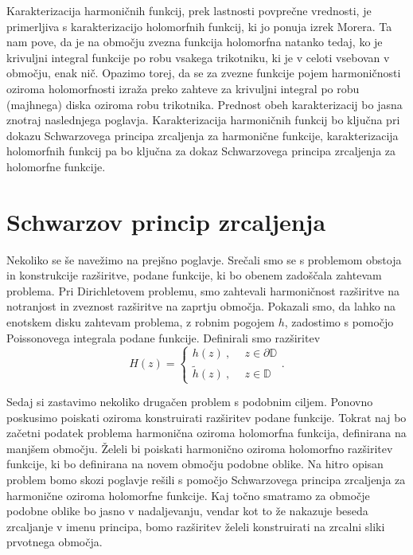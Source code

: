 \documentclass[mat1, tisk]{fmfdelo}
\begin{document}
    Karakterizacija harmoničnih funkcij, prek lastnosti povprečne vrednosti, je primerljiva s karakterizacijo holomorfnih funkcij, ki jo ponuja izrek Morera. 
    Ta nam pove, da je na območju zvezna funkcija holomorfna natanko tedaj, ko je krivuljni integral funkcije po robu vsakega trikotniku, ki je v celoti vsebovan v območju, enak nič.
    Opazimo torej, da se za zvezne funkcije pojem harmoničnosti oziroma holomorfnosti izraža preko zahteve za krivuljni integral po robu (majhnega) diska oziroma robu trikotnika.
    Prednost obeh karakterizacij bo jasna znotraj naslednjega poglavja. Karakterizacija harmoničnih funkcij bo ključna pri dokazu Schwarzovega principa zrcaljenja za harmonične funkcije, 
    karakterizacija holomorfnih funkcij pa bo ključna za dokaz Schwarzovega principa zrcaljenja za holomorfne funkcije. 


\section{Schwarzov princip zrcaljenja}

Nekoliko se še navežimo na prejšno poglavje. 
Srečali smo se s problemom obstoja in konstrukcije razširitve, podane funkcije, ki bo obenem zadoščala zahtevam problema.  
Pri Dirichletovem problemu, smo zahtevali harmoničnost razširitve na notranjost in zveznost razširitve na zaprtju območja. 
Pokazali smo, da lahko na enotskem disku zahtevam problema, z robnim pogojem $h$, zadostimo s pomočjo Poissonovega integrala podane funkcije. Definirali smo razširitev
$$
    H(z) = 
    \begin{cases}
        h(z)~,~~&z \in \partial \mathbb{D} \\
        \widetilde{h}(z)~,~~&z \in \mathbb{D}
    \end{cases}.
$$

Sedaj si zastavimo nekoliko drugačen problem s podobnim ciljem. Ponovno poskusimo poiskati oziroma konstruirati razširitev podane funkcije. 
Tokrat naj bo začetni podatek problema harmonična oziroma holomorfna funkcija, definirana na manjšem območju. Želeli bi poiskati harmonično oziroma holomorfno razširitev funkcije, ki bo definirana na novem območju podobne oblike.
Na hitro opisan problem bomo skozi poglavje rešili s pomočjo Schwarzovega principa zrcaljenja za harmonične oziroma holomorfne funkcije. 
Kaj točno smatramo za območje podobne oblike bo jasno v nadaljevanju, vendar kot to že nakazuje beseda zrcaljanje v imenu principa, bomo razširitev želeli konstruirati na zrcalni sliki prvotnega območja. 
\end{document}
